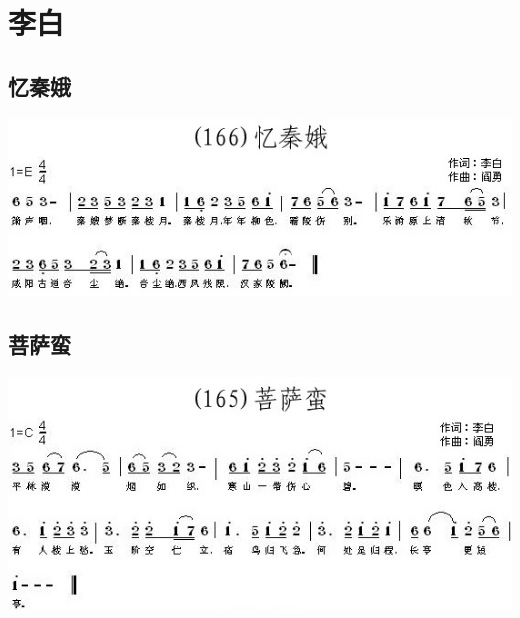 \documentclass[cn,pad,chinesefont=nofont,twocol]{elegantbook}
\begin{document}
  

\chapter{李白}
\section{忆秦娥}
    \includegraphics[width=\textwidth]{dongxiao/20200808-忆秦娥-李白.jpg} 
\section{菩萨蛮}
    \includegraphics[width=\textwidth]{dongxiao/20200808-菩萨蛮-李白.jpg} 
\end{document}
